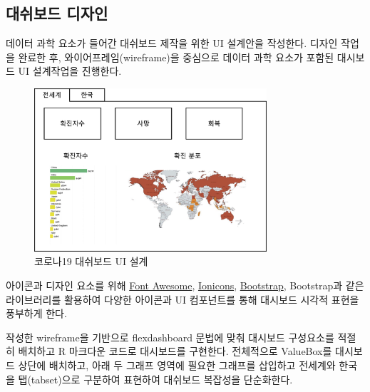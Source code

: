 \documentclass[
  letterpaper,
]{book}
\begin{document}
\hypertarget{corona-dashboard-design}{%
\subsection{대쉬보드 디자인}\label{corona-dashboard-design}}

데이터 과학 요소가 들어간 대쉬보드 제작을 위한 UI 설계안을 작성한다.
디자인 작업을 완료한 후, 와이어프레임(wireframe)을 중심으로 데이터 과학
요소가 포함된 대시보드 UI 설계작업을 진행한다.

\begin{figure}

{\centering \includegraphics[width=0.77\textwidth,height=\textheight]{images/corona-dashboard-ui.png}

}

\caption{코로나19 대쉬보드 UI 설계}

\end{figure}

아이콘과 디자인 요소를 위해
\href{https://fontawesome.com/icons?from=io}{Font Awesome},
\href{https://ionicons.com/}{Ionicons},
\href{https://getbootstrap.com/docs/4.4/components/alerts/}{Bootstrap},
Bootstrap과 같은 라이브러리를 활용하여 다양한 아이콘과 UI 컴포넌트를
통해 대시보드 시각적 표현을 풍부하게 한다.

작성한 wireframe을 기반으로 flexdashboard 문법에 맞춰 대시보드
구성요소를 적절히 배치하고 R 마크다운 코드로 대시보드를 구현한다.
전체적으로 ValueBox를 대시보드 상단에 배치하고, 아래 두 그래프 영역에
필요한 그래프를 삽입하고 전세계와 한국을 탭(tabset)으로 구분하여
표현하여 대쉬보드 복잡성을 단순화한다.
\end{document}
